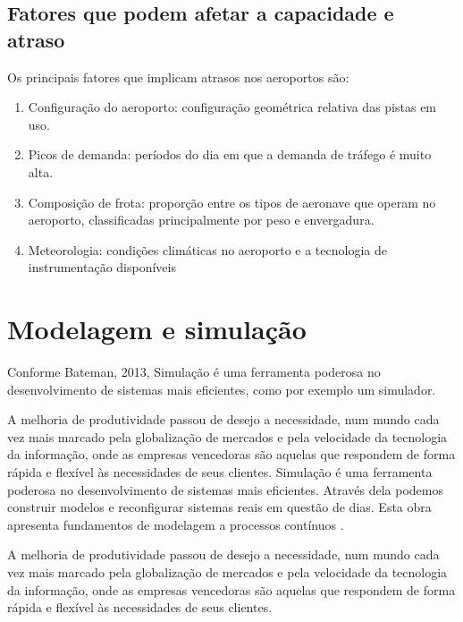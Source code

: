 \documentclass[12pt]{article}
\begin{document}
  \subsection{Fatores que podem afetar a capacidade e atraso}
  
  Os principais fatores que implicam atrasos nos aeroportos são:
  
  
  \begin{enumerate}
    
    \item Configuração do aeroporto: configuração geométrica relativa das pistas 
      em uso.
  
    \item Picos de demanda: períodos do dia em que a demanda de tráfego é muito
      alta.
  
    \item Composição de frota: proporção entre os tipos de aeronave que operam no 
    aeroporto, classificadas principalmente por peso e envergadura.
  
    \item Meteorologia: condições climáticas no aeroporto e a tecnologia de 
    instrumentação disponíveis
  
  \end{enumerate}
  
  \section{Modelagem e simulação}
  
  Conforme Bateman, 2013, Simulação é uma ferramenta poderosa no 
  desenvolvimento de sistemas mais eficientes, como por exemplo um simulador.
  
  A melhoria de produtividade passou de desejo a necessidade, num mundo cada 
  vez mais marcado pela globalização de mercados e pela velocidade da
  tecnologia da informação, onde as empresas vencedoras são aquelas que
  respondem de forma rápida e flexível às necessidades de seus clientes.
  Simulação é uma ferramenta poderosa no desenvolvimento de sistemas mais
  eficientes. Através dela podemos construir modelos e reconfigurar
  sistemas reais em questão de dias. Esta obra apresenta fundamentos de
  modelagem a processos contínuos \cite{Bateman:13}.
  
  A melhoria de produtividade passou de desejo a necessidade, num mundo 
  cada vez mais marcado pela globalização de mercados e pela velocidade
  da tecnologia da informação, onde as empresas vencedoras são aquelas
  que respondem de forma rápida e flexível às necessidades de seus clientes. 
  
\end{document}
